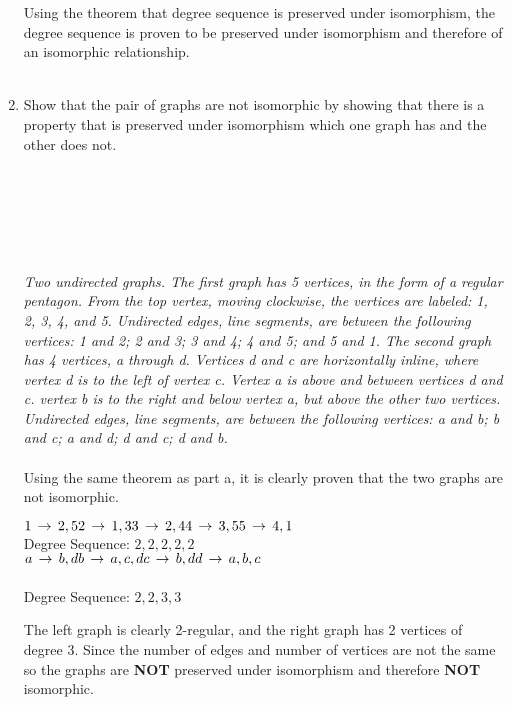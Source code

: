 \documentclass{amsart}
\theoremstyle{definition}
\theoremstyle{Exercise}
\theoremstyle{remark}
\theoremstyle{rule}
\numberwithin{equation}{section}
\begin{document}
\begin{enumerate}[label=(\alph*)]
Using the theorem that degree sequence is preserved under isomorphism, the degree sequence is proven to be preserved under isomorphism
and therefore of an isomorphic relationship.
\\\\
\item Show that the pair of graphs are not isomorphic by showing that there is a property that is preserved under isomorphism which one graph has and the other does not.\\
\\\\
\\\\
\vspace*{0.2in}
\\\\
{\color{blue}{\bf Figure 5:} \emph{Two undirected graphs. The first graph has 5 vertices, in the form of a regular pentagon. From the top vertex, moving clockwise, the vertices are labeled: 1, 2, 3, 4, and 5. Undirected edges, line segments, are between the following vertices: 1 and 2; 2 and 3; 3 and 4; 4 and 5; and 5 and 1. The second graph has 4 vertices, a through d. Vertices d and c are horizontally inline, where vertex d is to the left of vertex c. Vertex a is above and between vertices d and c. vertex b is to the right and below vertex a, but above the other two vertices. Undirected edges, line segments, are between the following vertices: a and b; b and c; a and d; d and c; d and b.
}
}
\\
\\
Using the same theorem as part a, it is clearly proven that the two graphs are not isomorphic.
\begin{multicols}{2}\noindent
    $1\, \rightarrow\, 2, 5\\
    2\, \rightarrow\, 1, 3\\
    3\, \rightarrow\, 2, 4\\
    4\, \rightarrow\, 3, 5\\
    5\, \rightarrow\, 4, 1$\\
    Degree Sequence: $2, 2, 2, 2, 2$
\columnbreak\\
    $a\, \rightarrow\, b, d\\
    b\, \rightarrow\, a, c, d\\
    c\, \rightarrow\, b, d\\
    d\, \rightarrow\, a, b, c$\\
    \\
    Degree Sequence: $2, 2, 3, 3$
\end{multicols}

The left graph is clearly 2-regular, and the right graph has 2 vertices of degree 3. Since the number of edges and number of vertices
are not the same so the graphs are {\bf NOT} preserved under isomorphism and therefore {\bf NOT} isomorphic.
\\\\
\end{enumerate}    
    
\end{document}
